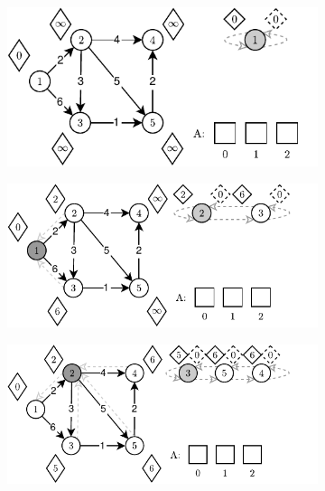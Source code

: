 \begin{figure}[!htbp]
	\centering
	\begin{subfigure}[b]{0.45\textwidth}
		\includegraphics[width=\textwidth]{Chapter_II/FIBONACCI-Example/a.pdf}
		\caption{}
	\end{subfigure}%
	\begin{subfigure}[b]{0.45\textwidth}
		\includegraphics[width=\textwidth]{Chapter_II/FIBONACCI-Example/b.pdf}
		\caption{}
	\end{subfigure}
	\begin{subfigure}[b]{0.45\textwidth}
		\includegraphics[width=\textwidth]{Chapter_II/FIBONACCI-Example/c.pdf}
		\caption{}
	\end{subfigure}%
	\begin{subfigure}[b]{0.45\textwidth}

\end{subfigure}
\end{figure}
